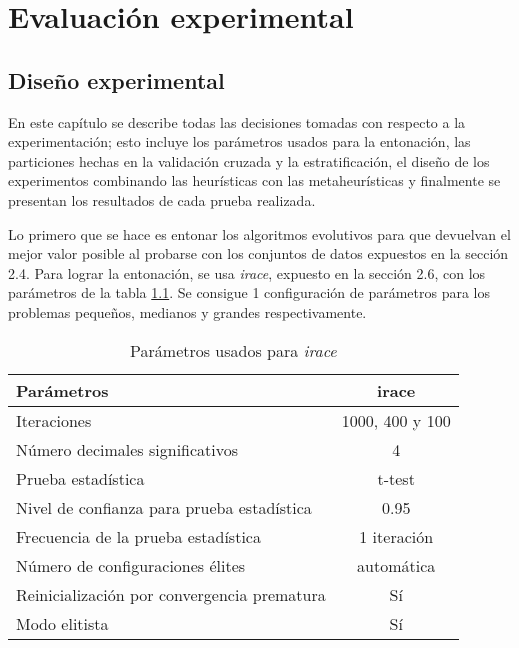 \chapter{Evaluación experimental}
\label{capitulo3}

\section{Diseño experimental}

En este capítulo se describe todas las decisiones tomadas con respecto a la experimentación; esto incluye los parámetros usados para la entonación, las particiones hechas en la validación cruzada y la estratificación, el diseño de los experimentos combinando las heurísticas con las metaheurísticas y finalmente se presentan los resultados de cada prueba realizada. 

Lo primero que se hace es entonar los algoritmos evolutivos para que devuelvan el mejor valor posible al probarse con los conjuntos de datos expuestos en la sección 2.4. Para lograr la entonación, se usa \emph{irace}, expuesto en la sección 2.6, con los parámetros de la tabla \ref{irace-param}. Se consigue 1 configuración de parámetros para los problemas pequeños, medianos y grandes respectivamente.

\begin{table}[]
\centering
\begin{tabular}{l c}
\hline
Parámetros & irace \\
\hline
\hline
Iteraciones                                 &  1000, 400 y 100\\
Número decimales significativos             &    4            \\
Prueba estadística                          &  t-test         \\
Nivel de confianza para prueba estadística  &  0.95           \\
Frecuencia de la prueba estadística         &    1 iteración  \\
Número de configuraciones élites            &  automática     \\
Reinicialización por convergencia prematura &     Sí          \\
Modo elitista                               &     Sí          \\

\hline
\end{tabular}
\caption{Parámetros usados para \emph{irace}}
\label{irace-param}
\end{table}

